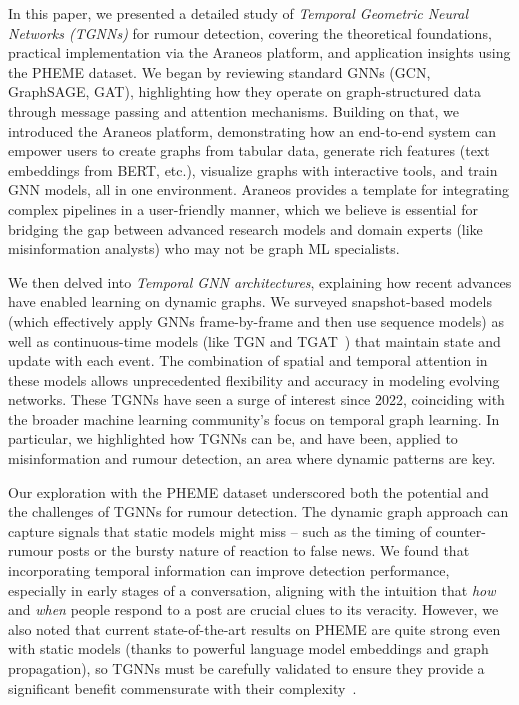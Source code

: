 \documentclass{cshonours}
\begin{document}
In this paper, we presented a detailed study of \emph{Temporal Geometric Neural Networks (TGNNs)} for rumour detection, covering the theoretical foundations, practical implementation via the Araneos platform, and application insights using the PHEME dataset. We began by reviewing standard GNNs (GCN, GraphSAGE, GAT), highlighting how they operate on graph-structured data through message passing and attention mechanisms. Building on that, we introduced the Araneos platform, demonstrating how an end-to-end system can empower users to create graphs from tabular data, generate rich features (text embeddings from BERT, etc.), visualize graphs with interactive tools, and train GNN models, all in one environment. Araneos provides a template for integrating complex pipelines in a user-friendly manner, which we believe is essential for bridging the gap between advanced research models and domain experts (like misinformation analysts) who may not be graph ML specialists.

We then delved into \emph{Temporal GNN architectures}, explaining how recent advances have enabled learning on dynamic graphs. We surveyed snapshot-based models (which effectively apply GNNs frame-by-frame and then use sequence models) as well as continuous-time models (like TGN and TGAT~\cite{xu2020tgat}) that maintain state and update with each event. The combination of spatial and temporal attention in these models allows unprecedented flexibility and accuracy in modeling evolving networks. These TGNNs have seen a surge of interest since 2022, coinciding with the broader machine learning community's focus on temporal graph learning. In particular, we highlighted how TGNNs can be, and have been, applied to misinformation and rumour detection, an area where dynamic patterns are key.

Our exploration with the PHEME dataset underscored both the potential and the challenges of TGNNs for rumour detection. The dynamic graph approach can capture signals that static models might miss – such as the timing of counter-rumour posts or the bursty nature of reaction to false news. We found that incorporating temporal information can improve detection performance, especially in early stages of a conversation, aligning with the intuition that \emph{how} and \emph{when} people respond to a post are crucial clues to its veracity. However, we also noted that current state-of-the-art results on PHEME are quite strong even with static models (thanks to powerful language model embeddings and graph propagation), so TGNNs must be carefully validated to ensure they provide a significant benefit commensurate with their complexity~\cite{dynamic_gnn_survey_2024}.
\end{document}
